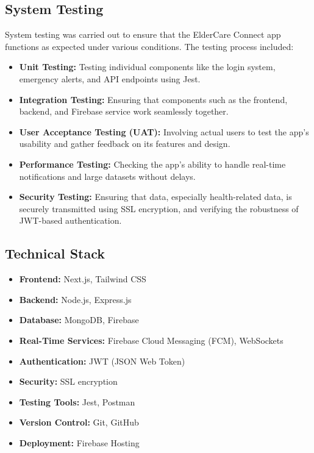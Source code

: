 \documentclass[a4paper, 12pt]{article}
\begin{document}
\subsection{ System Testing}

System testing was carried out to ensure that the ElderCare Connect app functions as expected under various conditions. The testing process included:

\begin{itemize}
    \item \textbf{Unit Testing:} Testing individual components like the login system, emergency alerts, and API endpoints using Jest.
    \item \textbf{Integration Testing:} Ensuring that components such as the frontend, backend, and Firebase service work seamlessly together.
    \item \textbf{User Acceptance Testing (UAT):} Involving actual users to test the app’s usability and gather feedback on its features and design.
    \item \textbf{Performance Testing:} Checking the app's ability to handle real-time notifications and large datasets without delays.
    \item \textbf{Security Testing:} Ensuring that data, especially health-related data, is securely transmitted using SSL encryption, and verifying the robustness of JWT-based authentication.
\end{itemize}

\subsection{Technical Stack}

\begin{itemize}
    \item \textbf{Frontend:} Next.js, Tailwind CSS
    \item \textbf{Backend:} Node.js, Express.js
    \item \textbf{Database:} MongoDB, Firebase
    \item \textbf{Real-Time Services:} Firebase Cloud Messaging (FCM), WebSockets
    \item \textbf{Authentication:} JWT (JSON Web Token)
    \item \textbf{Security:} SSL encryption
    \item \textbf{Testing Tools:} Jest, Postman
    \item \textbf{Version Control:} Git, GitHub
    \item \textbf{Deployment:} Firebase Hosting
\end{itemize}
\end{document}
